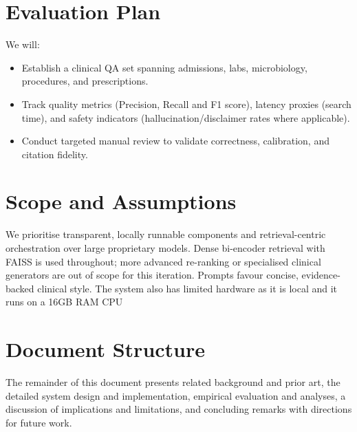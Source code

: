\section{Evaluation Plan}
We will:
\begin{itemize}
  \item Establish a clinical QA set spanning admissions, labs, microbiology, procedures, and prescriptions.
  \item Track quality metrics (Precision, Recall and F1 score), latency proxies (search time), and safety indicators (hallucination/disclaimer rates where applicable).
  \item Conduct targeted manual review to validate correctness, calibration, and citation fidelity.
\end{itemize}

\section{Scope and Assumptions}
We prioritise transparent, locally runnable components and retrieval-centric orchestration over large proprietary models. Dense bi-encoder retrieval with FAISS is used throughout; more advanced re-ranking or specialised clinical generators are out of scope for this iteration. Prompts favour concise, evidence-backed clinical style.
The system also has limited hardware as it is local and it runs on a 16GB RAM CPU

\section{Document Structure}
The remainder of this document presents related background and prior art, the detailed system design and implementation, empirical evaluation and analyses, a discussion of implications and limitations, and concluding remarks with directions for future work.

